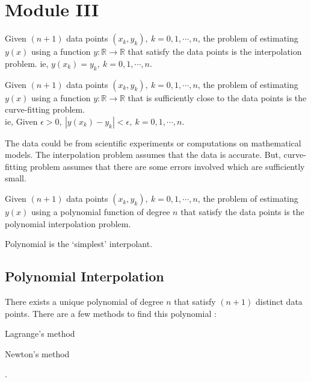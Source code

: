 \chapter{Module III}
\begin{definition}
	Given $(n+1)$ data points $(x_k, y_k),\ k = 0,1,\cdots,n$, the problem of estimating $y(x)$ using a function $y : \mathbb{R} \to \mathbb{R}$ that satisfy the data points is the interpolation problem. ie, $y(x_k) = y_k,\ k = 0,1,\cdots,n$.
\end{definition}
\begin{definition}
	Given $(n+1)$ data points $(x_k,y_k),\ k = 0,1,\cdots,n$, the problem of estimating $y(x)$ using a function $y : \mathbb{R} \to \mathbb{R}$ that is sufficiently close to the data points is the curve-fitting problem.\\ ie, Given $\epsilon > 0,\ |y(x_k)-y_k| < \epsilon,\ k = 0,1,\cdots,n$.
\end{definition}
\begin{remark}
\begin{commentary}
The data could be from scientific experiments or computations on mathematical models. The interpolation problem assumes that the data is accurate. But, curve-fitting problem assumes that there are some errors involved which are sufficiently small.
\end{commentary}
\end{remark}
\begin{definition}
	Given $(n+1)$ data points $(x_k,y_k),\ k = 0,1,\cdots,n$, the problem of estimating $y(x)$ using a polynomial function of degree $n$ that satisfy the data points is the polynomial interpolation problem.
\end{definition}
\begin{remark}
	Polynomial is the `simplest' interpolant.\cite[3.2]{kiusalaas}
\end{remark}

\section{Polynomial Interpolation}
There exists a unique polynomial of degree $n$ that satisfy $(n+1)$ distinct data points. There are a few methods to find this polynomial : 
\begin{enumerate*}
	\item Lagrange's method
	\item Newton's method
\end{enumerate*}.

